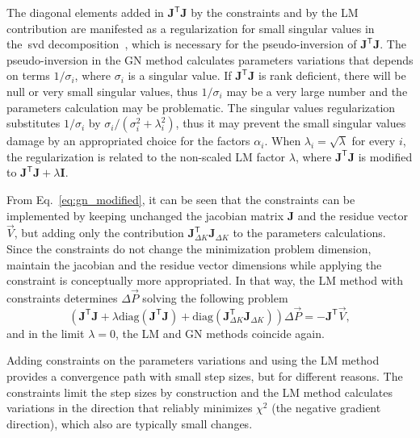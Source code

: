 The diagonal elements added in $\mathbf{J}^{\mathsf{T}}\mathbf{J}$ by the constraints and by the LM contribution are manifested as a regularization for small singular values in the~\gls{svd} decomposition~\cite{huang2019beam}, which is necessary for the pseudo-inversion of $\mathbf{J}^{\mathsf{T}}\mathbf{J}$. The pseudo-inversion in the GN method calculates parameters variations that depends on terms $1/\sigma_i$, where $\sigma_i$ is a singular value. If $\mathbf{J}^{\mathsf{T}}\mathbf{J}$ is rank deficient, there will be null or very small singular values, thus $1/\sigma_i$ may be a very large number and the parameters calculation may be problematic. The singular values regularization substitutes $1/\sigma_i$ by $\sigma_i/\left(\sigma_i^2 + \lambda_i^2\right)$, thus it may prevent the small singular values damage by an appropriated choice for the factors $\alpha_i$. When $\lambda_i = \sqrt{\lambda}$ for every $i$, the regularization is related to the non-scaled LM factor $\lambda$, where $\mathbf{J}^{\mathsf{T}}\mathbf{J}$ is modified to $\mathbf{J}^{\mathsf{T}}\mathbf{J} + \lambda \mathbf{I}$.

From Eq.~\eqref{eq:gn_modified}, it can be seen that the constraints can be implemented by keeping unchanged the jacobian matrix $\mathbf{J}$ and the residue vector $\vec{V}$, but adding only the contribution $\mathbf{J}^{\mathsf{T}}_{\Delta K}\mathbf{J}_{\Delta K}$ to the parameters calculations. Since the constraints do not change the minimization problem dimension, maintain the jacobian and the residue vector dimensions while applying the constraint is conceptually more appropriated. In that way, the LM method with constraints determines $\Delta \vec{P}$ solving the following problem
\begin{equation}
\left(\mathbf{J}^{\mathsf{T}}\mathbf{J} + \lambda \mathrm{diag}\left(\mathbf{J}^{\mathsf{T}}\mathbf{J}\right) + \mathrm{diag}\left(\mathbf{J}^{\mathsf{T}}_{\Delta K}\mathbf{J}_{\Delta K}\right) \right)\Delta \vec{P} = - \mathbf{J}^{\mathsf{T}}\vec{V},
\label{eq:param_calc}
\end{equation}
and in the limit $\lambda = 0$, the LM and GN methods coincide again.

Adding constraints on the parameters variations and using the LM method provides a convergence path with small step sizes, but for different reasons. The constraints limit the step sizes by construction and the LM method calculates variations in the direction that reliably minimizes $\chi^2$ (the negative gradient direction), which also are typically small changes.

